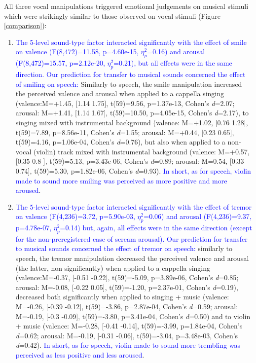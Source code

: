 \documentclass[openacc]{rsprocb_new}%
\begin{document}
All three vocal manipulations triggered emotional judgements on musical stimuli which were strikingly similar to those observed on vocal stimuli (Figure \ref{comparison}): 
\begin{enumerate}
\item \textcolor{blue}{The 5-level sound-type factor interacted significantly with the effect of smile on valence (F(8,472)=11.58, p=4.60e-15, $\eta_p^2$=0.16) and arousal (F(8,472)=15.57, p=2.12e-20, $\eta_p^2$=0.21), but all effects were in the same direction. Our prediction for transfer to musical sounds concerned the effect of smiling on speech:} Similarly to speech, the smile manipulation increased the perceived valence and arousal when applied to a cappella singing (valence:M=+1.45, [1.14 1.75], t(59)=9.56, p=1.37e-13, Cohen's \emph{d}=2.07; arousal: M=+1.41, [1.14 1.67], t(59)=10.50, p=4.05e-15, Cohen's \emph{d}=2.17), to singing mixed with instrumental background (valence: M=+1.02, [0.76 1.28], t(59)=7.89, p=8.56e-11, Cohen's \emph{d}=1.55; arousal: M=+0.44, [0.23 0.65], t(59)=4.16, p=1.06e-04, Cohen's \emph{d}=0.76), but also when applied to a non-vocal (violin) track mixed with instrumental background (valence: M=+0.57, [0.35 0.8 ], t(59)=5.13, p=3.43e-06, Cohen's \emph{d}=0.89; arousal: M=0.54, [0.33 0.74], t(59)=5.30, p=1.82e-06, Cohen's \emph{d}=0.93). \textcolor{blue}{In short, as for speech, violin made to sound more smiling was perceived as more positive and more aroused}.

\item \textcolor{blue}{The 5-level sound-type factor interacted significantly with the effect of tremor on valence (F(4,236)=3.72, p=5.90e-03, $\eta_p^2$=0.06) and arousal (F(4,236)=9.37, p=4.78e-07, $\eta_p^2$=0.14) but, again, all effects were in the same direction (except for the non-preregistered case of scream arousal). Our prediction for transfer to musical sounds concerned the effect of tremor on speech:} similarly to speech, the tremor manipulation decreased the perceived valence and arousal (the latter, non significantly) when applied to a cappella singing (valence:M=-0.37, [-0.51 -0.22], t(59)=-5.09, p=3.89e-06, Cohen's \emph{d}=0.85; arousal: M=-0.08, [-0.22  0.05], t(59)=-1.20, p=2.37e-01, Cohen's \emph{d}=0.19), decreased both significantly when applied to singing + music (valence: M=-0.26, [-0.39 -0.12], t(59)=-3.86, p=2.87e-04, Cohen's \emph{d}=0.59; arousal: M=-0.19, [-0.3  -0.09], t(59)=-3.80, p=3.41e-04, Cohen's \emph{d}=0.50) and to violin + music (valence: M=-0.28, [-0.41 -0.14], t(59)=-3.99, p=1.84e-04, Cohen's \emph{d}=0.62; arousal: M=-0.19, [-0.31 -0.06], t(59)=-3.04, p=3.48e-03, Cohen's \emph{d}=0.42). \textcolor{blue}{In short, as for speech, violin made to sound more trembling was perceived as less positive and less aroused}. 


\end{enumerate}
\end{document}
